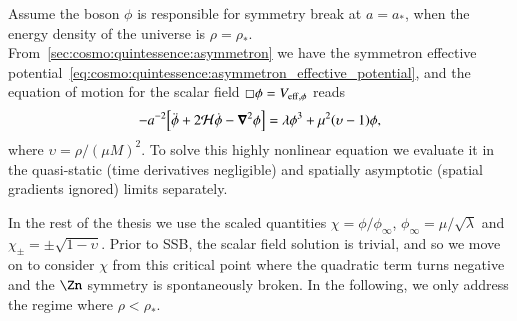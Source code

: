 


\newcommand{\eqregimenum}{\ALIASeqregimenum}
\newcommand{\brchi}{\breve{\chi}}


Assume the boson $\phi$ is responsible for symmetry break at $a=a_\ast$, when the energy density of the universe is $\rho=\rho_\ast$. %
From~\cref{sec:cosmo:quintessence:asymmetron} we have the symmetron effective potential~\cref{eq:cosmo:quintessence:asymmetron_effective_potential}, and the equation of motion for the scalar field $\sq \phi=V_{\mathrm{eff},\phi}$ reads
\begin{equation}
    -a^{-2} {\left[  \ddot{\phi} + 2\mathcal{H} \dot{\phi} - \boldsymbol{\nabla}^2\phi  \right]} = \lambda \phi^3 +\mu^2 {\left(  \upsilon-1 \right)}\phi,
\end{equation}
where $\upsilon=\rho/(\mu M)^2$. %
To solve this highly nonlinear equation we evaluate it in the quasi-static (time derivatives negligible) and spatially asymptotic (spatial gradients ignored) limits separately. 


In the rest of the thesis we use the scaled quantities $\chi=\phi/\phi_\infty$, $\phi_\infty=\mu/\sqrt{\lambda}$ and $\chi_\pm=\pm\sqrt{1-\upsilon}$. Prior to SSB, the scalar field solution is trivial, and so we move on to consider $\chi$ from this critical point where the quadratic term turns negative and the $\Zn$ symmetry is spontaneously broken. In the following, we only address the regime where $\rho< \rho_\ast$.













